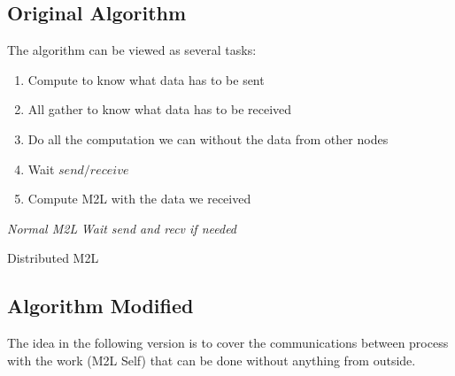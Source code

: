 \documentclass[12pt,letterpaper,titlepage]{report}
\begin{document}
\subsection{Original Algorithm}
The algorithm can be viewed as several tasks:
\begin{enumerate}
\item Compute to know what data has to be sent
\item All gather to know what data has to be received
\item Do all the computation we can without the data from other nodes
\item Wait $send/receive$
\item Compute M2L with the data we received
\end{enumerate}
\BlankLine
\begin{algorithm}[H]
  \LinesNumbered
  \SetAlgoLined
  \BlankLine
  \emph{Normal M2L}\;
  \emph{Wait send and recv if needed}\;
  \BlankLine
  \caption{Distributed M2L}
\end{algorithm}

\subsection{Algorithm Modified}
The idea in the following version is to cover the communications
between process with the work (M2L Self) that can be done without
anything from outside.
\end{document}
